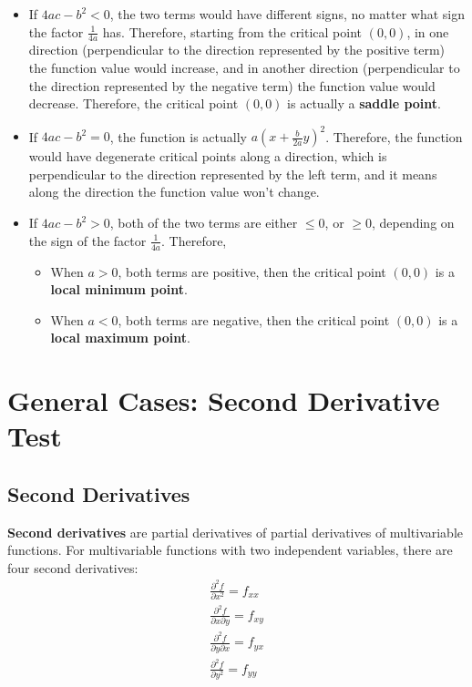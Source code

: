 \documentclass{article}
\begin{document}
\begin{itemize}
  \item If $4ac - b^2 < 0$, the two terms would have different signs, no matter 
    what sign the factor $\frac{1}{4a}$ has. Therefore, starting from the 
    critical point $(0, 0)$, in one direction (perpendicular to the direction 
    represented by the positive term) the function value would increase, and in 
    another direction (perpendicular to the direction represented by the 
    negative term) the function value would decrease. Therefore, the critical 
    point $(0, 0)$ is actually a \textbf{saddle point}.
  \item If $4ac - b^2 = 0$, the function is actually $a(x + \frac{b}{2a}y)^2$. 
    Therefore, the function would have degenerate critical points along a 
    direction, which is perpendicular to the direction represented by the left 
    term, and it means along the direction the function value won't change.
  \item If $4ac - b^2 > 0$, both of the two terms are either $\leq 0$, or 
    $\geq 0$, depending on the sign of the factor $\frac{1}{4a}$. Therefore,
    \begin{itemize}
      \item When $a > 0$, both terms are positive, then the critical point 
        $(0, 0)$ is a \textbf{local minimum point}.
      \item When $a < 0$, both terms are negative, then the critical point
        $(0, 0)$ is a \textbf{local maximum point}.
    \end{itemize}
\end{itemize}

\section{General Cases: Second Derivative Test}

\subsection{Second Derivatives}

\textbf{Second derivatives} are partial derivatives of partial derivatives of 
multivariable functions. For multivariable functions with two independent 
variables, there are four second derivatives:
\begin{gather*}
  \frac{\partial^2 f}{\partial x^2} = f_{xx} \\
  \frac{\partial^2 f}{\partial x \partial y} = f_{xy} \\
  \frac{\partial^2 f}{\partial y \partial x} = f_{yx} \\
  \frac{\partial^2 f}{\partial y^2} = f_{yy} \\
\end{gather*}
\end{document}

